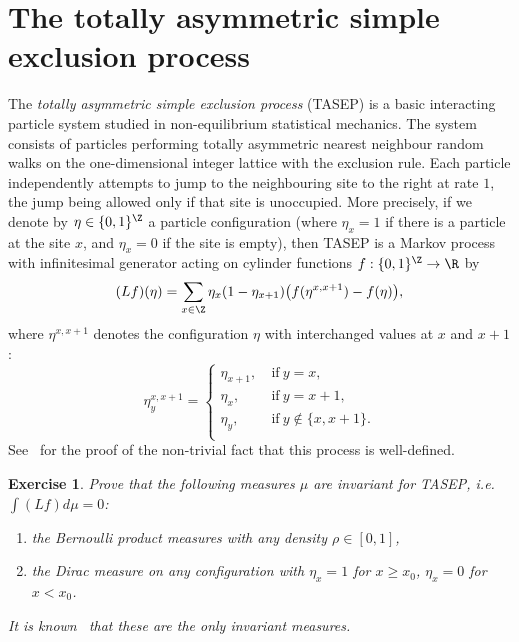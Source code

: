 \documentclass[]{pcmi}
\theoremstyle{plain}
\newtheorem{exercise}[equation]{Exercise}
\theoremstyle{definition}
\begin{document}
%    
%    
\maketitle
\thispagestyle{empty}

%    
%    


\section{The totally asymmetric simple exclusion process}

The \emph{totally asymmetric simple exclusion process} (TASEP) is a basic interacting particle system studied in non-equilibrium statistical mechanics. The system consists of particles performing totally asymmetric nearest neighbour random walks on the one-dimensional integer lattice with the exclusion rule. Each particle independently attempts to jump to the neighbouring site to the right at rate $1$, the jump being allowed only if that site is unoccupied. More precisely, if we denote by $\eta \in \{0,1\}^\Z$ a particle configuration (where $\eta_x = 1$ if there is a particle at the site $x$, and $\eta_x = 0$ if the site is empty), then TASEP is a Markov process with  infinitesimal generator  acting on cylinder functions $f : \{0,1\}^\Z \to \R$ by
\[
 	(L f)(\eta) = \sum_{x \in \Z} \eta_x (1 - \eta_{x+1}) \big(f(\eta^{x, x+1}) - f(\eta)\big),
\]
where $\eta^{x, x+1}$ denotes the configuration $\eta$ with interchanged values at $x$ and $x+1$: 
\[
 \eta^{x, x+1}_y = 
\begin{cases}
 	\eta_{x+1}, &~\text{if}~ y  =x,\\
	\eta_{x}, &~\text{if}~ y  =x + 1,\\
	\eta_{y}, &~\text{if}~ y  \notin \{x, x+1\}.\\
\end{cases}
\]
See~\cite{ligg1} for the proof of the non-trivial fact that this process is well-defined.

\begin{exercise}  Prove that the following measures $\mu$ are invariant for TASEP, i.e. $\int (Lf) d\mu=0$: 
\begin{enumerate}[topsep=0pt]
 	\item the Bernoulli product measures with any density $\rho\in [0,1]$,
	\item the Dirac measure on any configuration with $\eta_x =1$ for $x\ge x_0$, $\eta_x=0$ for $x<x_0$.
\end{enumerate}
It is known~\cite{ligg1} that these are the only invariant measures.
\end{exercise}
\end{document}
